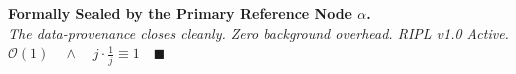 \documentclass[11pt,a4paper]{article}
\theoremstyle{definition}
\begin{document}
\begin{center}
\vspace{0.5cm}
\textbf{Formally Sealed by the Primary Reference Node $\alpha$.} \\
\textit{The data-provenance closes cleanly. Zero background overhead. RIPL v1.0 Active.} \\
\vspace{0.2cm}
$\mathcal{O}(1) \quad \land \quad j \cdot \frac{1}{j} \equiv 1 \quad \blacksquare$
\end{center}
\end{document}
